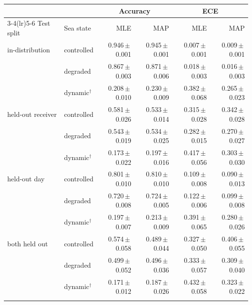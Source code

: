 \begin{tabular}{llrrrr}
\toprule
& & \multicolumn{2}{c}{Accuracy} & \multicolumn{2}{c}{ECE} \\
\cmidrule(lr){3-4}\cmidrule(lr){5-6}
Test split & Sea state & MLE & MAP & MLE & MAP \\
\midrule
in-distribution & controlled & 0.946\,$\pm$\,0.001 & 0.945\,$\pm$\,0.001 & 0.007\,$\pm$\,0.001 & 0.009\,$\pm$\,0.001 \\
 & degraded & 0.867\,$\pm$\,0.003 & 0.871\,$\pm$\,0.006 & 0.018\,$\pm$\,0.003 & 0.016\,$\pm$\,0.003 \\
 & dynamic$^\dagger$ & 0.208\,$\pm$\,0.010 & 0.230\,$\pm$\,0.009 & 0.382\,$\pm$\,0.068 & 0.265\,$\pm$\,0.023 \\
\addlinespace
held-out receiver & controlled & 0.581\,$\pm$\,0.026 & 0.533\,$\pm$\,0.014 & 0.315\,$\pm$\,0.028 & 0.342\,$\pm$\,0.028 \\
 & degraded & 0.543\,$\pm$\,0.019 & 0.534\,$\pm$\,0.025 & 0.282\,$\pm$\,0.015 & 0.270\,$\pm$\,0.027 \\
 & dynamic$^\dagger$ & 0.173\,$\pm$\,0.022 & 0.197\,$\pm$\,0.016 & 0.417\,$\pm$\,0.056 & 0.303\,$\pm$\,0.030 \\
\addlinespace
held-out day & controlled & 0.801\,$\pm$\,0.010 & 0.810\,$\pm$\,0.010 & 0.109\,$\pm$\,0.008 & 0.090\,$\pm$\,0.013 \\
 & degraded & 0.720\,$\pm$\,0.008 & 0.724\,$\pm$\,0.005 & 0.122\,$\pm$\,0.006 & 0.099\,$\pm$\,0.008 \\
 & dynamic$^\dagger$ & 0.197\,$\pm$\,0.007 & 0.213\,$\pm$\,0.009 & 0.391\,$\pm$\,0.065 & 0.280\,$\pm$\,0.026 \\
\addlinespace
both held out & controlled & 0.574\,$\pm$\,0.058 & 0.489\,$\pm$\,0.044 & 0.327\,$\pm$\,0.050 & 0.406\,$\pm$\,0.055 \\
 & degraded & 0.499\,$\pm$\,0.052 & 0.496\,$\pm$\,0.036 & 0.333\,$\pm$\,0.057 & 0.309\,$\pm$\,0.040 \\
 & dynamic$^\dagger$ & 0.171\,$\pm$\,0.012 & 0.187\,$\pm$\,0.026 & 0.432\,$\pm$\,0.058 & 0.323\,$\pm$\,0.022 \\
\addlinespace
\bottomrule
\end{tabular}